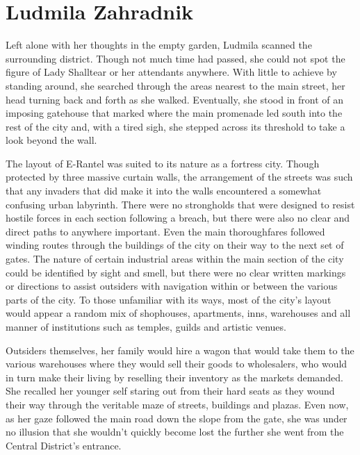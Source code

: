 \chapter{Ludmila Zahradnik}

Left alone with her thoughts in the empty garden, Ludmila scanned the surrounding district. Though not much time had passed, she could not spot the figure of Lady Shalltear or her attendants anywhere. With little to achieve by standing around, she searched through the areas nearest to the main street, her head turning back and forth as she walked. Eventually, she stood in front of an imposing gatehouse that marked where the main promenade led south into the rest of the city and, with a tired sigh, she stepped across its threshold to take a look beyond the wall.

 

The layout of E-Rantel was suited to its nature as a fortress city. Though protected by three massive curtain walls, the arrangement of the streets was such that any invaders that did make it into the walls encountered a somewhat confusing urban labyrinth. There were no strongholds that were designed to resist hostile forces in each section following a breach, but there were also no clear and direct paths to anywhere important. Even the main thoroughfares followed winding routes through the buildings of the city on their way to the next set of gates. The nature of certain industrial areas within the main section of the city could be identified by sight and smell, but there were no clear written markings or directions to assist outsiders with navigation within or between the various parts of the city. To those unfamiliar with its ways, most of the city’s layout would appear a random mix of shophouses, apartments, inns, warehouses and all manner of institutions such as temples, guilds and artistic venues.

 

Outsiders themselves, her family would hire a wagon that would take them to the various warehouses where they would sell their goods to wholesalers, who would in turn make their living by reselling their inventory as the markets demanded. She recalled her younger self staring out from their hard seats as they wound their way through the veritable maze of streets, buildings and plazas. Even now, as her gaze followed the main road down the slope from the gate, she was under no illusion that she wouldn’t quickly become lost the further she went from the Central District’s entrance.

